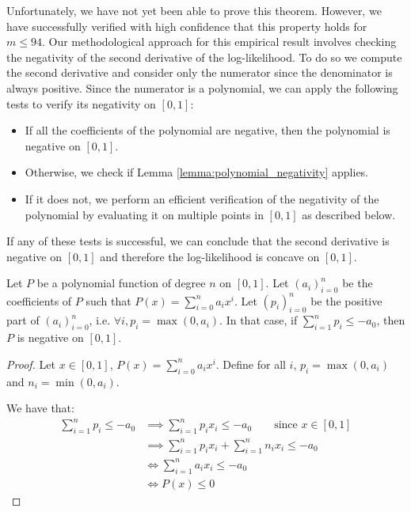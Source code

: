 Unfortunately, we have not yet been able to prove this theorem. However, we have successfully verified with high confidence that this property holds for $m \leq 94$. Our methodological approach for this empirical result involves checking the negativity of the second derivative of the log-likelihood. To do so we compute the second derivative and consider only the numerator since the denominator is always positive. Since the numerator is a polynomial, we can apply the following tests to verify its negativity on $[0,1]$:
\begin{itemize}
    \item If all the coefficients of the polynomial are negative, then the polynomial is negative on $[0,1]$. 
    \item Otherwise, we check if Lemma \ref{lemma:polynomial_negativity} applies.
    \item If it does not, we perform an efficient verification of the negativity of the polynomial by evaluating it on multiple points in $[0,1]$ as described below.
\end{itemize}
If any of these tests is successful, we can conclude that the second derivative is negative on $[0,1]$ and therefore the log-likelihood is concave on $[0,1]$.

\begin{lemma}
    \label{lemma:polynomial_negativity}
    Let $P$ be a polynomial function of degree $n$ on $[0, 1]$. Let $(a_i)_{i=0}^{n}$ be the coefficients of $P$ such that $P(x) = \sum_{i=0}^{n} a_i x^i$. Let $(p_i)_{i=0}^n$ be the positive part of $(a_i)_{i=0}^n$, i.e. $\forall i, p_i = \max(0,a_i)$. In that case, if $\sum_{i=1}^{n} p_i \leq -a_0$, then $P$ is negative on $[0, 1]$.
\end{lemma}


\begin{proof}
    Let $x \in [0, 1]$, $P(x) = \sum_{i=0}^{n} a_i x^i$. Define for all $i$, $p_i = \max(0, a_i)$ and $n_i = \min(0, a_i)$.

    We have that:
    \begin{align}
        \sum_{i=1}^{n} p_i \leq -a_0 &\implies \sum_{i=1}^{n} p_i x_i \leq -a_0 \qquad \text{since $x\in [0, 1]$} \\
        &\implies \sum_{i=1}^{n} p_i x_i + \sum_{i=1}^{n} n_i x_i \leq -a_0 \\
        &\iff \sum_{i=1}^{n} a_i x_i \leq -a_0 \\
        &\iff P(x) \leq 0
    \end{align}
\end{proof}

